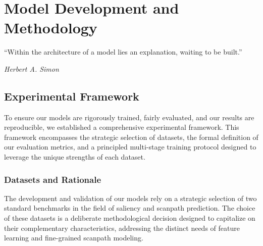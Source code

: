 \chapter{Model Development and Methodology}
\label{cha:methodology}

\epigraph{\enquote{Within the architecture of a model lies an explanation, waiting to be built.}}{\emph{Herbert A. Simon}}

\section{Experimental Framework}
\label{sec:method_experimental_framework}
To ensure our models are rigorously trained, fairly evaluated, and our results are reproducible, we established a comprehensive experimental framework. This framework encompasses the strategic selection of datasets, the formal definition of our evaluation metrics, and a principled multi-stage training protocol designed to leverage the unique strengths of each dataset.
\subsection{Datasets and Rationale}
\label{sec:method_datasets}
The development and validation of our models rely on a strategic selection of two standard benchmarks in the field of saliency and scanpath prediction. The choice of these datasets is a deliberate methodological decision designed to capitalize on their complementary characteristics, addressing the distinct needs of feature learning and fine-grained scanpath modeling.
